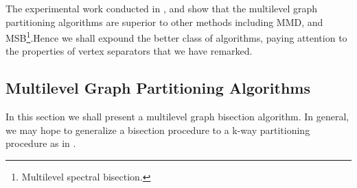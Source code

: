 \documentclass[a4paper,12pt]{article}
\begin{document}
The experimental work conducted in \cite{kumar},\cite{bend} and
\cite{gupta1} show that the multilevel graph partitioning algorithms
are superior to other methods including MMD, and MSB\footnote{
Multilevel spectral bisection.}.Hence we shall expound the better class
of algorithms, paying attention to the properties of vertex separators
that we have remarked.


\subsection{Multilevel Graph Partitioning Algorithms}

In this section we shall present a multilevel graph bisection
algorithm. In general, we may hope to generalize a bisection
procedure to a k-way partitioning procedure as in \cite{kl}.
\end{document}
